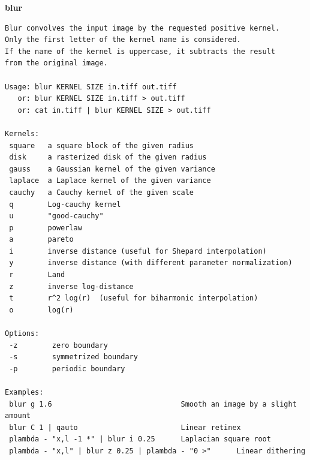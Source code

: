 {\bf blur}
 \begin{verbatim}
Blur convolves the input image by the requested positive kernel.
Only the first letter of the kernel name is considered.
If the name of the kernel is uppercase, it subtracts the result
from the original image.

Usage: blur KERNEL SIZE in.tiff out.tiff
   or: blur KERNEL SIZE in.tiff > out.tiff
   or: cat in.tiff | blur KERNEL SIZE > out.tiff

Kernels:
 square   a square block of the given radius
 disk     a rasterized disk of the given radius
 gauss    a Gaussian kernel of the given variance
 laplace  a Laplace kernel of the given variance
 cauchy   a Cauchy kernel of the given scale
 q        Log-cauchy kernel
 u        "good-cauchy"
 p        powerlaw
 a        pareto
 i        inverse distance (useful for Shepard interpolation)
 y        inverse distance (with different parameter normalization)
 r        Land
 z        inverse log-distance
 t        r^2 log(r)  (useful for biharmonic interpolation)
 o        log(r)

Options:
 -z        zero boundary
 -s        symmetrized boundary
 -p        periodic boundary

Examples:
 blur g 1.6                              Smooth an image by a slight amount
 blur C 1 | qauto                        Linear retinex
 plambda - "x,l -1 *" | blur i 0.25      Laplacian square root
 plambda - "x,l" | blur z 0.25 | plambda - "0 >"      Linear dithering
 \end{verbatim}

